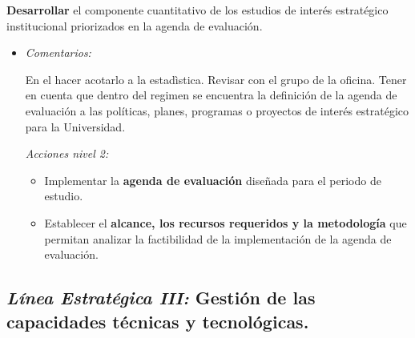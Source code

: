 \documentclass[
]{book}
\providecommand{\tightlist}{%
  \setlength{\itemsep}{0pt}\setlength{\parskip}{0pt}}
\begin{document}
\begin{itemize}
\begin{itemize}
    \textbf{Desarrollar} el componente cuantitativo de los estudios de interés estratégico institucional priorizados en la agenda de evaluación.

    \begin{itemize}
    \item
      \emph{Comentarios:}

      En el hacer acotarlo a la estadìstica. Revisar con el grupo de la oficina. Tener en cuenta que dentro del regimen se encuentra la definición de la agenda de evaluación a las políticas, planes, programas o proyectos de interés estratégico para la Universidad.

      \emph{Acciones nivel 2:}

      \begin{itemize}
      \tightlist
      \item
        Implementar la \textbf{agenda de evaluación} diseñada para el periodo de estudio.
      \item
        Establecer el \textbf{alcance, los recursos requeridos y la metodología} que permitan analizar la factibilidad de la implementación de la agenda de evaluación.
      \end{itemize}
    \end{itemize}
  \end{itemize}
\end{itemize}

\hypertarget{luxednea-estratuxe9gica-iii-gestiuxf3n-de-las-capacidades-tuxe9cnicas-y-tecnoluxf3gicas.}{%
\subsection{\texorpdfstring{\emph{Línea Estratégica III:} Gestión de las capacidades técnicas y tecnológicas.}{Línea Estratégica III: Gestión de las capacidades técnicas y tecnológicas.}}\label{luxednea-estratuxe9gica-iii-gestiuxf3n-de-las-capacidades-tuxe9cnicas-y-tecnoluxf3gicas.}}
\end{document}
